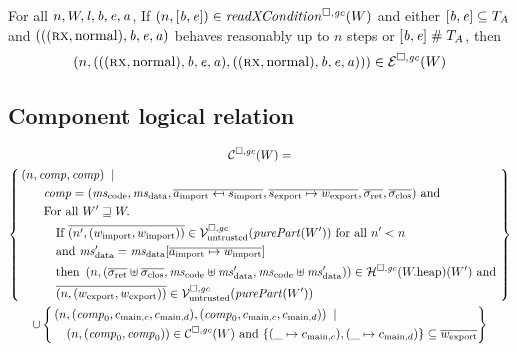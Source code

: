 \documentclass[acmsmall,review,anonymous]{acmart}\settopmatter{printfolios=true,printccs=false,printacmref=false}
\begin{document}
\begin{lemma}[FTLR]
  \label{thm:ftlr}
  For all $n,W,\mathit{l},\mathit{b},\mathit{e},\mathit{a}$,
  If $\npair{[\baddr,\eaddr]} \in \xReadCond{W}$
  and either $[\mathit{b},\mathit{e}] \subseteq T_{A}$ and $({((\textsc{rx},\mathrm{normal}),\mathit{b},\mathit{e},\mathit{a})}$ behaves reasonably up to $n$ steps or
$[\mathit{b},\mathit{e}] \mathrel{\#} T_{A}$,
then 
  \[
    \left(n,\left(((\textsc{rx},\mathrm{normal}),\mathit{b},\mathit{e},\mathit{a}),
      ((\textsc{rx},\mathrm{normal}),\mathit{b},\mathit{e},\mathit{a})\right)\right) \in \mathcal{E}^{\square,\mathit{gc}}(W)
  \]
\end{lemma}


\subsection{Component logical relation}


\begin{multline*}
  \lrcomp(W) =\\
  \left\{\begin{aligned}
      &\npair{\var{comp},\var{comp}} \;\mid \;\\
      &\qquad\var{comp} = (\mscode,\msdata,\overline{a_{\mathrm{import}} \mapsfrom s_{\mathrm{import}}},\overline{s_{\mathrm{export}} \mapsto w_{\mathrm{export}}},\sigrets,\sigcloss) \tand \\
      &\qquad\text{For all } W' \future W \ldotp \\
      &\qquad\quad\text{If } \overline{\npair[n']{(w_{\mathrm{import}},w_{\mathrm{import}})}} \in \lrv(\purePart{W'}) \text{ for all $n' < n$}\\
      &\qquad\quad\text{and } \msdata' = \msdata{}[\overline{a_{\mathrm{import}} \mapsto w_{\mathrm{import}}}] \\
      &\qquad\quad\text{then } \npair{(\sigrets\uplus\sigcloss,\mscode\uplus \msdata', \mscode\uplus\msdata')} \in \lrheap(\pwheap)(W') \tand\\
      &\qquad\quad\overline{\npair{(w_{\mathrm{export}},w_{\mathrm{export}})}} \in \lrv(\purePart{W'})
    \end{aligned}
  \right\}\\
\cup \left\{
    \begin{multlined}
      \npair{(\var{comp}_0,c_{\mathrm{main},c}, c_{\mathrm{main},d}),(\var{comp}_0,c_{\mathrm{main},c}, c_{\mathrm{main},d})} \;\mid \;\\
      \npair{(\var{comp}_0,\var{comp}_0)} \in \lrcomp(W) \tand
      \{(\_ \mapsto c_{\mathrm{main},c}),(\_ \mapsto c_{\mathrm{main},d})\} \subseteq \overline{w_{\mathrm{export}}}
    \end{multlined}
  \right\} 
\end{multline*}
\end{document}

